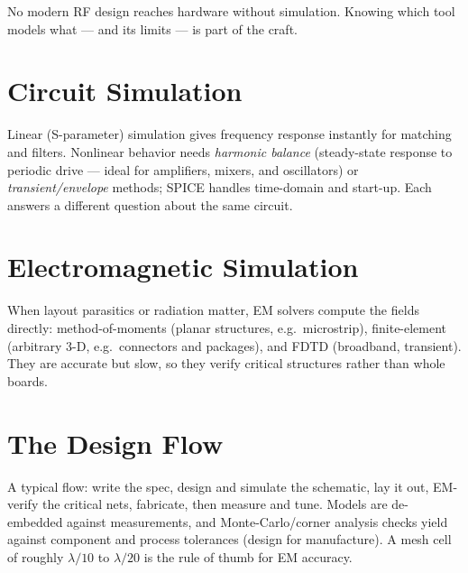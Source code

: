 No modern RF design reaches hardware without simulation. Knowing which tool models
what --- and its limits --- is part of the craft.

\section{Circuit Simulation}
Linear (S-parameter) simulation gives frequency response instantly for matching
and filters. Nonlinear behavior needs \emph{harmonic balance} (steady-state
response to periodic drive --- ideal for amplifiers, mixers, and oscillators) or
\emph{transient/envelope} methods; SPICE handles time-domain and start-up. Each
answers a different question about the same circuit.

\section{Electromagnetic Simulation}
When layout parasitics or radiation matter, EM solvers compute the fields
directly: method-of-moments (planar structures, e.g.\ microstrip), finite-element
(arbitrary 3-D, e.g.\ connectors and packages), and FDTD (broadband, transient).
They are accurate but slow, so they verify critical structures rather than whole
boards.

\section{The Design Flow}
A typical flow: write the spec, design and simulate the schematic, lay it out, EM-
verify the critical nets, fabricate, then measure and tune. Models are de-embedded
against measurements, and Monte-Carlo/corner analysis checks yield against
component and process tolerances (design for manufacture). A mesh cell of roughly
$\lambda/10$ to $\lambda/20$ is the rule of thumb for EM accuracy.
